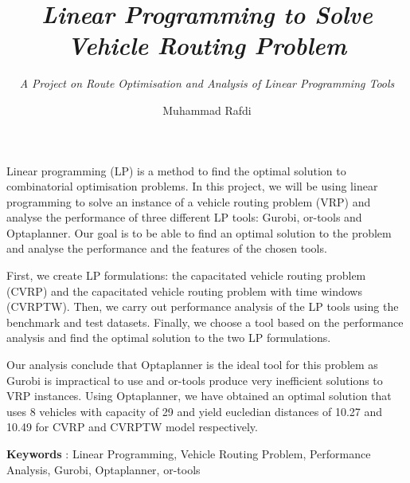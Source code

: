 \documentclass[a4paper,12pt,numbered,print,index]{report/thesisFormat}
\title{\textit{Linear Programming to Solve\\Vehicle Routing Problem}}
\subtitle{\textit{A Project on Route Optimisation and Analysis of Linear Programming Tools}}
\author{Muhammad Rafdi}
\newenvironment{romanpages}{
  \setcounter{page}{1}
  \renewcommand{\thepage}{\roman{page}}}
{\newpage\renewcommand{\thepage}{\arabic{page}}}
\begin{document}
\begin{romanpages}

\begin{titlepage}
  \maketitle
\end{titlepage}

\begin{abstract2}

    Linear programming (LP) is a method to find the optimal solution to combinatorial optimisation problems.
    In this project, we will be using linear programming to solve an instance of a vehicle routing problem (VRP) and
     analyse the performance of three different LP tools: Gurobi, or-tools and
    Optaplanner. Our goal is to be able to find an optimal solution to the problem and analyse the performance and the features
    of the chosen tools.

    First, we create LP formulations: the capacitated vehicle routing problem (CVRP) and the capacitated
     vehicle routing problem with time windows (CVRPTW). Then, we carry out performance
    analysis of the LP tools using the benchmark and test datasets. Finally, we choose a tool based
    on the performance analysis and find the optimal solution to the two LP formulations.

    Our analysis conclude that Optaplanner is the ideal tool for this problem as Gurobi is impractical to use
     and or-tools produce very inefficient solutions to VRP instances. Using
    Optaplanner, we have obtained an optimal solution that uses 8 vehicles with capacity of 29 and yield eucledian
    distances of 10.27 and 10.49 for CVRP and CVRPTW model respectively.

   \vspace{1.5cm}
   \textbf{Keywords} : Linear Programming, Vehicle Routing Problem, Performance Analysis, Gurobi, Optaplanner, or-tools

\end{abstract2}


\setcounter{page}{1}

\tableofcontents

\listoffigures

\listoftables

\end{romanpages}


\end{document}
